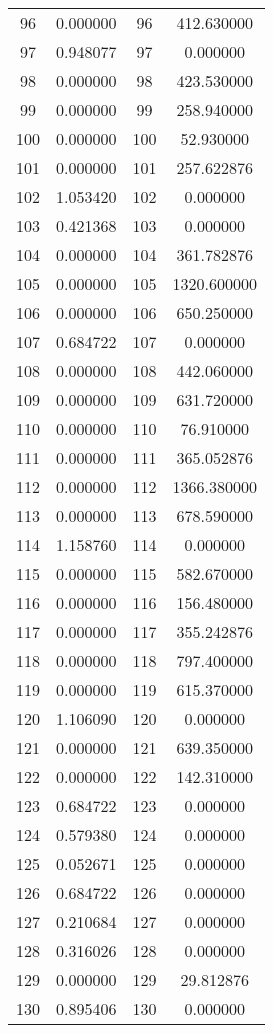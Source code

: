 \documentclass[12pt]{article}
\begin{document}
\begin{longtable}{@{}cccc@{}}
96 & 0.000000 & 96 & 412.630000 \\
97 & 0.948077 & 97 & 0.000000 \\
98 & 0.000000 & 98 & 423.530000 \\
99 & 0.000000 & 99 & 258.940000 \\
100 & 0.000000 & 100 & 52.930000 \\
101 & 0.000000 & 101 & 257.622876 \\
102 & 1.053420 & 102 & 0.000000 \\
103 & 0.421368 & 103 & 0.000000 \\
104 & 0.000000 & 104 & 361.782876 \\
105 & 0.000000 & 105 & 1320.600000 \\
106 & 0.000000 & 106 & 650.250000 \\
107 & 0.684722 & 107 & 0.000000 \\
108 & 0.000000 & 108 & 442.060000 \\
109 & 0.000000 & 109 & 631.720000 \\
110 & 0.000000 & 110 & 76.910000 \\
111 & 0.000000 & 111 & 365.052876 \\
112 & 0.000000 & 112 & 1366.380000 \\
113 & 0.000000 & 113 & 678.590000 \\
114 & 1.158760 & 114 & 0.000000 \\
115 & 0.000000 & 115 & 582.670000 \\
116 & 0.000000 & 116 & 156.480000 \\
117 & 0.000000 & 117 & 355.242876 \\
118 & 0.000000 & 118 & 797.400000 \\
119 & 0.000000 & 119 & 615.370000 \\
120 & 1.106090 & 120 & 0.000000 \\
121 & 0.000000 & 121 & 639.350000 \\
122 & 0.000000 & 122 & 142.310000 \\
123 & 0.684722 & 123 & 0.000000 \\
124 & 0.579380 & 124 & 0.000000 \\
125 & 0.052671 & 125 & 0.000000 \\
126 & 0.684722 & 126 & 0.000000 \\
127 & 0.210684 & 127 & 0.000000 \\
128 & 0.316026 & 128 & 0.000000 \\
129 & 0.000000 & 129 & 29.812876 \\
130 & 0.895406 & 130 & 0.000000 \\

\end{longtable}
\end{document}
